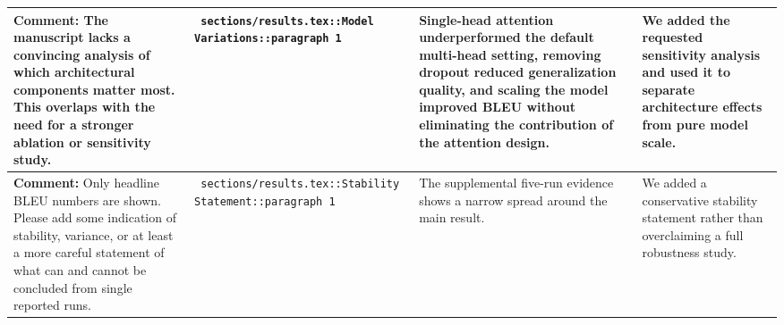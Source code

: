 \documentclass[11pt]{article}
\begin{document}
\begin{longtable}{|p{}|p{}|p{}|p{}|}
\hline
\textbf{Comment:} The manuscript lacks a convincing analysis of which architectural components matter most. This overlaps with the need for a stronger ablation or sensitivity study. & \texttt{ sections/results.tex::Model Variations::paragraph 1 } & {\color{blue}\ttfamily Single-head attention underperformed the default multi-head setting, removing dropout reduced generalization quality, and scaling the model improved BLEU without eliminating the contribution of the attention design.} & We added the requested sensitivity analysis and used it to separate architecture effects from pure model scale. \\
\hline
\textbf{Comment:} Only headline BLEU numbers are shown. Please add some indication of stability, variance, or at least a more careful statement of what can and cannot be concluded from single reported runs. & \texttt{ sections/results.tex::Stability Statement::paragraph 1 } & {\color{blue}\ttfamily The supplemental five-run evidence shows a narrow spread around the main result.} & We added a conservative stability statement rather than overclaiming a full robustness study. \\
\hline
\end{longtable}
\end{document}
